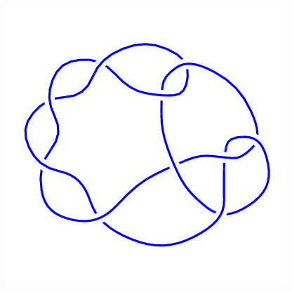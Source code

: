\begin{figure}[H]
\begin{minipage}[b]{.18\linewidth}
	\end{minipage}
	\begin{minipage}[b]{.18\linewidth}
		\centering
		\includegraphics[width=\linewidth]{../data/10_36.png}
	\end{minipage}
\end{figure}
